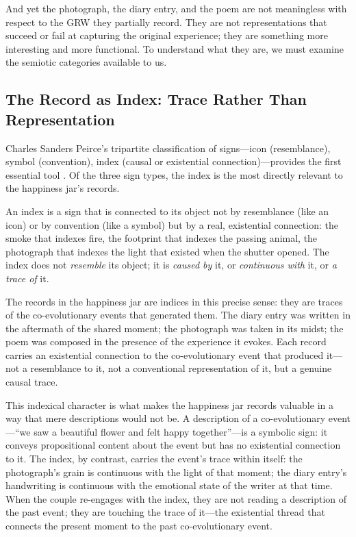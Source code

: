And yet the photograph, the diary entry, and the poem are not meaningless with respect to the GRW they partially record. They are not representations that succeed or fail at capturing the original experience; they are something more interesting and more functional. To understand what they are, we must examine the semiotic categories available to us.

\subsection{The Record as Index: Trace Rather Than Representation}
\label{p15:subsec:index}

\noindent
Charles Sanders Peirce's tripartite classification of signs---icon (resemblance), symbol (convention), index (causal or existential connection)---provides the first essential tool \parencite{peirce1931}. Of the three sign types, the index is the most directly relevant to the happiness jar's records.

An index is a sign that is connected to its object not by resemblance (like an icon) or by convention (like a symbol) but by a real, existential connection: the smoke that indexes fire, the footprint that indexes the passing animal, the photograph that indexes the light that existed when the shutter opened. The index does not \emph{resemble} its object; it is \emph{caused by} it, or \emph{continuous with} it, or \emph{a trace of} it.

The records in the happiness jar are indices in this precise sense: they are traces of the co-evolutionary events that generated them. The diary entry was written in the aftermath of the shared moment; the photograph was taken in its midst; the poem was composed in the presence of the experience it evokes. Each record carries an existential connection to the co-evolutionary event that produced it---not a resemblance to it, not a conventional representation of it, but a genuine causal trace.

This indexical character is what makes the happiness jar records valuable in a way that mere descriptions would not be. A description of a co-evolutionary event---``we saw a beautiful flower and felt happy together''---is a symbolic sign: it conveys propositional content about the event but has no existential connection to it. The index, by contrast, carries the event's trace within itself: the photograph's grain is continuous with the light of that moment; the diary entry's handwriting is continuous with the emotional state of the writer at that time. When the couple re-engages with the index, they are not reading a description of the past event; they are touching the trace of it---the existential thread that connects the present moment to the past co-evolutionary event.

